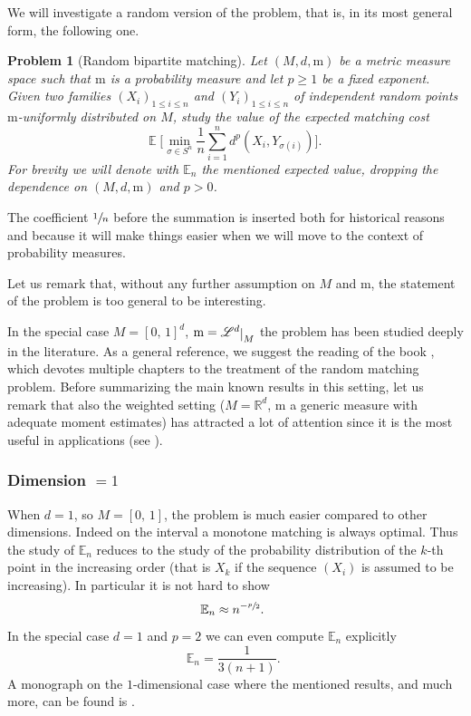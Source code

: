 \documentclass[10pt]{amsart}
\newcounter{results}[section]
\theoremstyle{plain}
\newtheorem*{problem*}{Problem}
\theoremstyle{definition}
\numberwithin{equation}{section}
\newcommand{\RR}{\ensuremath{\mathbb R}}
\newcommand{\bbE}[1]{\ensuremath{\operatorname{\mathbb{E}}\biggl[#1\biggr]}}
\newcommand{\Leb}{\ensuremath{\mathscr L}}
\newcommand{\cc}[2]{\ensuremath{\left[#1,\,#2\right]}}
\newcommand{\fullstop}{\ensuremath{\text{. }}}
\newcommand{\m}{\ensuremath{\mathrm m}}
\newcommand{\restricts}[2] {
	#1 %
	\raisebox{-.3ex}{$|$}_{#2}
}
\begin{document}
We will investigate a random version of the problem, that is, in its most general form, the following one.
\begin{problem*}[Random bipartite matching]
Let $(M, d, \m)$ be a metric measure space such that $\m$ is a probability measure and let $p\ge 1$ be
a fixed exponent.
Given two families $(X_i)_{1\le i\le n}$ and $(Y_i)_{1\le i\le n}$ of independent random points
$\m$-uniformly distributed on $M$, study the value of the expected matching cost
\begin{equation*}
\bbE{\min_{\sigma\in S^n} \frac1n\sum_{i=1}^n d^p\left(X_i, Y_{\sigma(i)}\right)} \fullstop
\end{equation*}
For brevity we will denote with $\mathbb E_n$ the mentioned expected value, dropping the dependence on
$(M, d, \m)$ and $p>0$.
\end{problem*}
The coefficient $\sfrac1n$ before the summation is inserted both for historical reasons and because it will
make things easier when we will move to the context of probability measures.

Let us remark that, without any further assumption on $M$ and $\m$, the statement of the problem is too general to be interesting.

In the special case $M=\cc01^d$, $\m=\restricts{\Leb^d}{M}$ the problem has been studied deeply in
the literature.
As a general reference, we suggest the reading of the book \cite{Talagrand14}, which devotes multiple chapters to
the treatment of the random matching problem.
Before summarizing the main known results in this setting, let us remark that also the weighted setting ($M=\RR^d$, $\m$ a generic measure with adequate moment estimates) has attracted a lot of attention since it is the most useful in applications (see \cite{DereichScheutzowSchottstedt2013,BoissarLeGouic2014,FournierGuillin2015,WeedBach2017}).

\subsubsection*{Dimension $=1$}
When $d=1$, so $M=\cc01$, the problem is much easier compared to
other dimensions. Indeed on the interval a monotone matching is always optimal.
Thus the study of $\mathbb E_n$ reduces to the study of the probability distribution of
the $k$-th point in the increasing order (that is $X_k$ if the sequence $(X_i)$ is assumed to be
increasing). In particular it is not hard to show
\begin{equation*}
\mathbb E_n \approx n^{-\sfrac p2} \fullstop
\end{equation*}
In the special case $d=1$ and $p=2$ we can even compute $\mathbb E_n$ explicitly
\begin{equation*}
\mathbb E_n = \frac 1{3(n+1)} \fullstop
\end{equation*}
A monograph on the $1$-dimensional case where the mentioned results, and much more, can be found
is \cite{Bobkov2014}.
\end{document}
